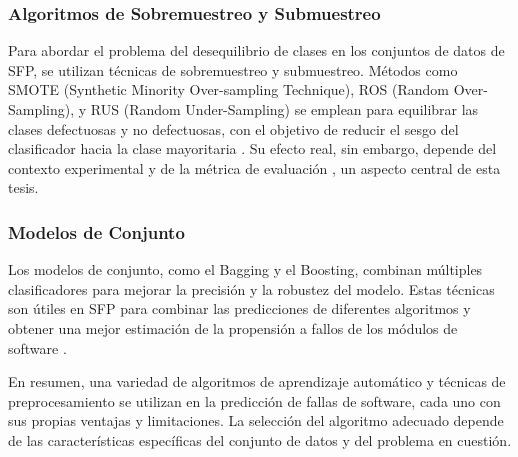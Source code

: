 \subsubsection{Algoritmos de Sobremuestreo y Submuestreo}
Para abordar el problema del desequilibrio de clases en los conjuntos de datos de SFP, se utilizan técnicas de sobremuestreo y submuestreo. Métodos como SMOTE (Synthetic Minority Over-sampling Technique), ROS (Random Over-Sampling), y RUS (Random Under-Sampling) se emplean para equilibrar las clases defectuosas y no defectuosas, con el objetivo de reducir el sesgo del clasificador hacia la clase mayoritaria \cite{9137899,chawla2002}. Su efecto real, sin embargo, depende del contexto experimental y de la métrica de evaluación \cite{8494821}, un aspecto central de esta tesis.

\subsubsection{Modelos de Conjunto}
Los modelos de conjunto, como el Bagging y el Boosting, combinan múltiples clasificadores para mejorar la precisión y la robustez del modelo. Estas técnicas son útiles en SFP para combinar las predicciones de diferentes algoritmos y obtener una mejor estimación de la propensión a fallos de los módulos de software \cite{9044596}.

En resumen, una variedad de algoritmos de aprendizaje automático y técnicas de preprocesamiento se utilizan en la predicción de fallas de software, cada uno con sus propias ventajas y limitaciones. La selección del algoritmo adecuado depende de las características específicas del conjunto de datos y del problema en cuestión.
